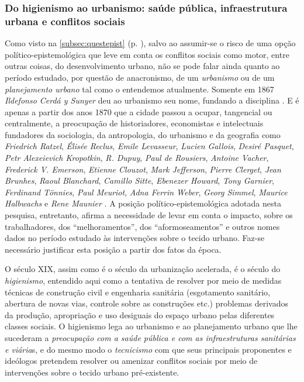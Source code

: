 \subsubsection{Do higienismo ao urbanismo: saúde pública, infraestrutura urbana e conflitos sociais}\label{subsubsec:higienurb}

Como visto na \autoref{subsec:questepist} (p. \pageref{subsec:questepist}), salvo ao assumir-se o risco de uma opção político-epistemológica que leve em conta os conflitos sociais como motor, entre outras coisas, do desenvolvimento urbano, não se pode falar ainda quanto ao período estudado, por questão de anacronismo, de um \textit{urbanismo} ou de um \textit{planejamento urbano} tal como o entendemos atualmente. Somente em 1867 \textit{Ildefonso Cerdá y Sunyer} deu ao urbanismo seu nome, fundando a disciplina \cite[pp.~47-51]{vasconcelos_dois_2012}. E é apenas a partir dos anos 1870 que a cidade passou a ocupar, tangencial ou centralmente, a preocupação de historiadores, economistas e intelectuais fundadores da sociologia, da antropologia, do urbanismo e da geografia como \textit{Friedrich Ratzel}, \textit{Élisée Reclus}, \textit{Emile Levasseur}, \textit{Lucien Gallois}, \textit{Desiré Pasquet}, \textit{Petr Alexeievich Kropotkin}, \textit{R. Dupuy}, \textit{Paul de Rousiers}, \textit{Antoine Vacher}, \textit{Frederick V. Emerson}, \textit{Etienne Clouzot}, \textit{Mark Jefferson}, \textit{Pierre Clerget}, \textit{Jean Brunhes}, \textit{Raoul Blanchard}, \textit{Camillo Sitte}, \textit{Ebenezer Howard}, \textit{Tony Garnier}, \textit{Ferdinand Tönnies}, \textit{Paul Meuriot}, \textit{Adna Ferrin Weber}, \textit{Georg Simmel}, \textit{Maurice Halbwachs} e \textit{Rene Maunier} \cite[pp.~53-102]{vasconcelos_dois_2012}. A posição político-epistemológica adotada nesta pesquisa, entretanto, afirma a necessidade de levar em conta o impacto, sobre os trabalhadores, dos ``melhoramentos'', dos ``aformoseamentos'' e outros nomes dados no período estudado às intervenções sobre o tecido urbano. Faz-se necessário justificar esta posição a partir dos fatos da época.

O século XIX, assim como é o século da urbanização acelerada, é o século do \textit{higienismo}, entendido aqui como a tentativa de resolver por meio de medidas técnicas de construção civil e engenharia sanitária (esgotamento sanitário, abertura de novas vias, controle sobre as construções etc.) problemas derivados da produção, apropriação e uso desiguais do espaço urbano pelas diferentes classes sociais. O higienismo lega ao urbanismo e ao planejamento urbano que lhe sucederam a \textit{preocupação com a saúde pública e com as infraestruturas sanitárias e viária}s, e do mesmo modo o \textit{tecnicismo} com que seus principais proponentes e ideólogos pretendem resolver ou amenizar conflitos sociais por meio de intervenções sobre o tecido urbano pré-existente.

